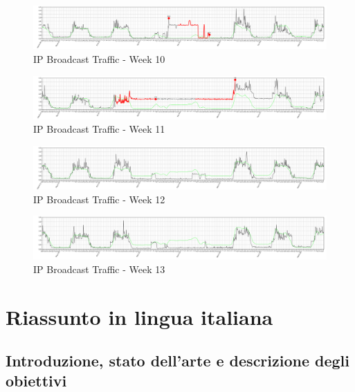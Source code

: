 \documentclass[12pt,a4paper,cucitura]{toptesi}
\begin{document}
\begin{figure}
\centering
\includegraphics[width=\textwidth]{bcast10.png}
\caption{IP Broadcast Traffic - Week 10}
\end{figure}

\begin{figure}
\centering
\includegraphics[width=\textwidth]{bcast11.png}
\caption{IP Broadcast Traffic - Week 11}
\end{figure}

\begin{figure}
\centering
\includegraphics[width=\textwidth]{bcast12.png}
\caption{IP Broadcast Traffic - Week 12}
\end{figure}

\begin{figure}
\centering
\includegraphics[width=\textwidth]{bcast13.png}
\caption{IP Broadcast Traffic - Week 13}
\end{figure}

\italiano

\chapter{Riassunto in lingua italiana}
\section{Introduzione, stato dell'arte e descrizione degli obiettivi}
\end{document}
